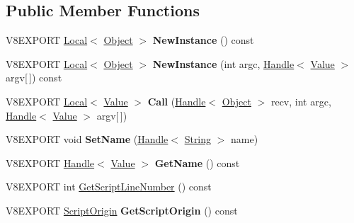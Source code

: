 \subsection*{Public Member Functions}
\begin{DoxyCompactItemize}
\item 
\hypertarget{classv8_1_1_function_a7461d71d7a0bf6e510d16200a7c64501}{}V8\+E\+X\+P\+O\+R\+T \hyperlink{classv8_1_1_local}{Local}$<$ \hyperlink{classv8_1_1_object}{Object} $>$ {\bfseries New\+Instance} () const \label{classv8_1_1_function_a7461d71d7a0bf6e510d16200a7c64501}

\item 
\hypertarget{classv8_1_1_function_a8a154fe47d441ae9baaf4e76b2efeadc}{}V8\+E\+X\+P\+O\+R\+T \hyperlink{classv8_1_1_local}{Local}$<$ \hyperlink{classv8_1_1_object}{Object} $>$ {\bfseries New\+Instance} (int argc, \hyperlink{classv8_1_1_handle}{Handle}$<$ \hyperlink{classv8_1_1_value}{Value} $>$ argv\mbox{[}$\,$\mbox{]}) const \label{classv8_1_1_function_a8a154fe47d441ae9baaf4e76b2efeadc}

\item 
\hypertarget{classv8_1_1_function_ac61877494d2d8bb81fcef96003ec4059}{}V8\+E\+X\+P\+O\+R\+T \hyperlink{classv8_1_1_local}{Local}$<$ \hyperlink{classv8_1_1_value}{Value} $>$ {\bfseries Call} (\hyperlink{classv8_1_1_handle}{Handle}$<$ \hyperlink{classv8_1_1_object}{Object} $>$ recv, int argc, \hyperlink{classv8_1_1_handle}{Handle}$<$ \hyperlink{classv8_1_1_value}{Value} $>$ argv\mbox{[}$\,$\mbox{]})\label{classv8_1_1_function_ac61877494d2d8bb81fcef96003ec4059}

\item 
\hypertarget{classv8_1_1_function_ab7abce9df66a4b02f8297c0ab0d5e090}{}V8\+E\+X\+P\+O\+R\+T void {\bfseries Set\+Name} (\hyperlink{classv8_1_1_handle}{Handle}$<$ \hyperlink{classv8_1_1_string}{String} $>$ name)\label{classv8_1_1_function_ab7abce9df66a4b02f8297c0ab0d5e090}

\item 
\hypertarget{classv8_1_1_function_ac8b07c4d3e6079ac8a7fb17c1784f456}{}V8\+E\+X\+P\+O\+R\+T \hyperlink{classv8_1_1_handle}{Handle}$<$ \hyperlink{classv8_1_1_value}{Value} $>$ {\bfseries Get\+Name} () const \label{classv8_1_1_function_ac8b07c4d3e6079ac8a7fb17c1784f456}

\item 
V8\+E\+X\+P\+O\+R\+T int \hyperlink{classv8_1_1_function_a3ae29205851ecbf99ab8ba03559fb849}{Get\+Script\+Line\+Number} () const 
\item 
\hypertarget{classv8_1_1_function_a9dfe892a6af9d2799abe3e24e726c0b1}{}V8\+E\+X\+P\+O\+R\+T \hyperlink{classv8_1_1_script_origin}{Script\+Origin} {\bfseries Get\+Script\+Origin} () const \label{classv8_1_1_function_a9dfe892a6af9d2799abe3e24e726c0b1}

\end{DoxyCompactItemize}
